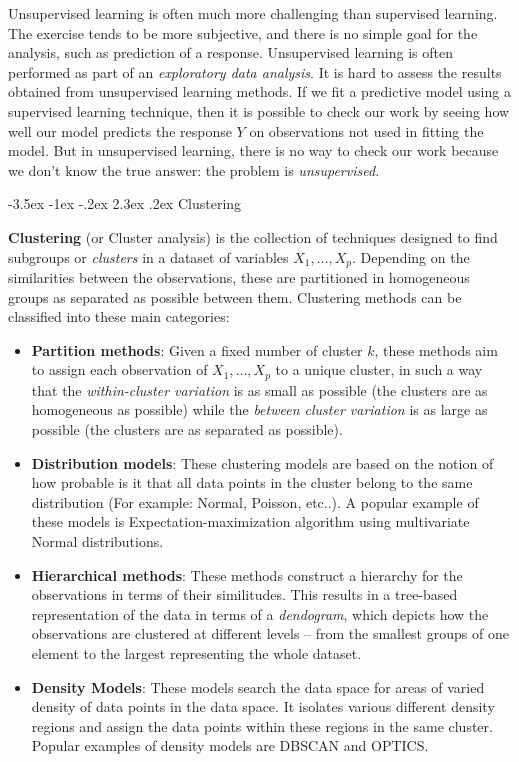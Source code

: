 \documentclass[]{book}
\makeatletter
\providecommand{\tightlist}{%
  \setlength{\itemsep}{0pt}\setlength{\parskip}{0pt}}
\renewcommand\section{\@startsection {section}{1}{\z@}%
                                   {-3.5ex \@plus -1ex \@minus -.2ex}%
                                   {2.3ex \@plus.2ex}%
                                   {\normalfont\Large\bfseries\color{ForestGreen}}}
\theoremstyle{definition}
\theoremstyle{definition}
\theoremstyle{definition}
\theoremstyle{remark}
\makeatother
\begin{document}
Unsupervised learning is often much more challenging than supervised
learning. The exercise tends to be more subjective, and there is no
simple goal for the analysis, such as prediction of a response.
Unsupervised learning is often performed as part of an \emph{exploratory
data analysis}. It is hard to assess the results obtained from
unsupervised learning methods. If we fit a predictive model using a
supervised learning technique, then it is possible to check our work by
seeing how well our model predicts the response \(Y\) on observations
not used in fitting the model. But in unsupervised learning, there is no
way to check our work because we don't know the true answer: the problem
is \emph{unsupervised}.

\section{Clustering}\label{clustering-1}

\textbf{Clustering} (or Cluster analysis) is the collection of
techniques designed to find subgroups or \emph{clusters} in a dataset of
variables \(X_1,\ldots,X_p\). Depending on the similarities between the
observations, these are partitioned in homogeneous groups as separated
as possible between them. Clustering methods can be classified into
these main categories:

\begin{itemize}
\tightlist
\item
  \textbf{Partition methods}: Given a fixed number of cluster \(k\),
  these methods aim to assign each observation of \(X_1,\ldots,X_p\) to
  a unique cluster, in such a way that the \emph{within-cluster
  variation} is as small as possible (the clusters are as homogeneous as
  possible) while the \emph{between cluster variation} is as large as
  possible (the clusters are as separated as possible).
\item
  \textbf{Distribution models}: These clustering models are based on the
  notion of how probable is it that all data points in the cluster
  belong to the same distribution (For example: Normal, Poisson, etc..).
  A popular example of these models is Expectation-maximization
  algorithm using multivariate Normal distributions.
\item
  \textbf{Hierarchical methods}: These methods construct a hierarchy for
  the observations in terms of their similitudes. This results in a
  tree-based representation of the data in terms of a \emph{dendogram},
  which depicts how the observations are clustered at different levels
  -- from the smallest groups of one element to the largest representing
  the whole dataset.
\item
  \textbf{Density Models}: These models search the data space for areas
  of varied density of data points in the data space. It isolates
  various different density regions and assign the data points within
  these regions in the same cluster. Popular examples of density models
  are DBSCAN and OPTICS.
\end{itemize}
\end{document}
